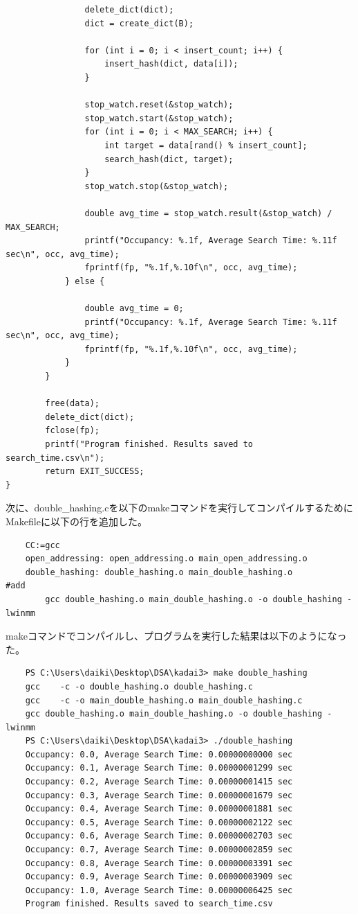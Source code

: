 \documentclass{ltjsarticle}
\begin{document}
\begin{lstlisting}
                delete_dict(dict);
                dict = create_dict(B);

                for (int i = 0; i < insert_count; i++) {
                    insert_hash(dict, data[i]);
                }

                stop_watch.reset(&stop_watch);
                stop_watch.start(&stop_watch);
                for (int i = 0; i < MAX_SEARCH; i++) {
                    int target = data[rand() % insert_count];
                    search_hash(dict, target);
                }
                stop_watch.stop(&stop_watch);

                double avg_time = stop_watch.result(&stop_watch) / MAX_SEARCH;
                printf("Occupancy: %.1f, Average Search Time: %.11f sec\n", occ, avg_time);
                fprintf(fp, "%.1f,%.10f\n", occ, avg_time);
            } else {

                double avg_time = 0;
                printf("Occupancy: %.1f, Average Search Time: %.11f sec\n", occ, avg_time);
                fprintf(fp, "%.1f,%.10f\n", occ, avg_time);
            }
        }

        free(data);
        delete_dict(dict);
        fclose(fp);
        printf("Program finished. Results saved to search_time.csv\n");
        return EXIT_SUCCESS;
}
\end{lstlisting}
次に、double\_hashing.cを以下のmakeコマンドを実行してコンパイルするためにMakefileに以下の行を追加した。
\begin{lstlisting}
    CC:=gcc
    open_addressing: open_addressing.o main_open_addressing.o
    double_hashing: double_hashing.o main_double_hashing.o         #add
        gcc double_hashing.o main_double_hashing.o -o double_hashing -lwinmm
\end{lstlisting}
makeコマンドでコンパイルし、プログラムを実行した結果は以下のようになった。
\begin{lstlisting}
    PS C:\Users\daiki\Desktop\DSA\kadai3> make double_hashing
    gcc    -c -o double_hashing.o double_hashing.c
    gcc    -c -o main_double_hashing.o main_double_hashing.c
    gcc double_hashing.o main_double_hashing.o -o double_hashing -lwinmm
    PS C:\Users\daiki\Desktop\DSA\kadai3> ./double_hashing
    Occupancy: 0.0, Average Search Time: 0.00000000000 sec
    Occupancy: 0.1, Average Search Time: 0.00000001299 sec
    Occupancy: 0.2, Average Search Time: 0.00000001415 sec
    Occupancy: 0.3, Average Search Time: 0.00000001679 sec
    Occupancy: 0.4, Average Search Time: 0.00000001881 sec
    Occupancy: 0.5, Average Search Time: 0.00000002122 sec
    Occupancy: 0.6, Average Search Time: 0.00000002703 sec
    Occupancy: 0.7, Average Search Time: 0.00000002859 sec
    Occupancy: 0.8, Average Search Time: 0.00000003391 sec
    Occupancy: 0.9, Average Search Time: 0.00000003909 sec
    Occupancy: 1.0, Average Search Time: 0.00000006425 sec
    Program finished. Results saved to search_time.csv
\end{lstlisting}
\end{document}
